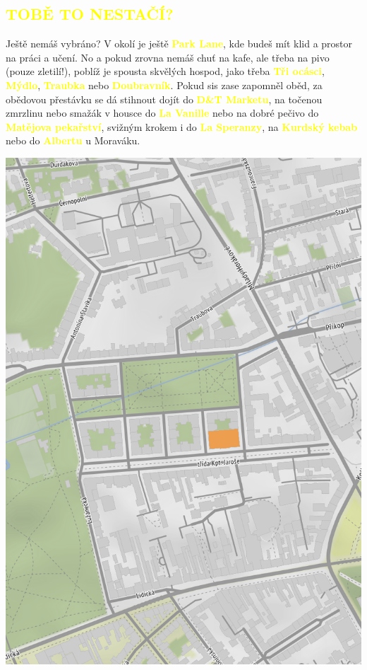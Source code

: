 \documentclass[a5paper, twoside]{article}
\newcommand{\podnadpis}[2]{
  \subsection*{\textcolor{#2}{#1}}
}
\begin{document}
\podnadpis{TOBĚ TO NESTAČÍ?}{yellow}
Ještě nemáš vybráno? V okolí je ještě \textcolor{yellow}{\textbf{Park Lane}}, kde budeš mít klid a prostor na práci a učení. No a pokud zrovna nemáš chuť na kafe, ale třeba na pivo (pouze zletilí!), poblíž je spousta skvělých hospod, jako třeba \textcolor{yellow}{\textbf{Tři ocásci}}, \textcolor{yellow}{\textbf{Mýdlo}}, \textcolor{yellow}{\textbf{Traubka}} nebo \textcolor{yellow}{\textbf{Doubravník}}. Pokud sis zase zapomněl oběd, za obědovou přestávku se dá stihnout dojít do \textcolor{yellow}{\textbf{D\&T Marketu}}, na točenou zmrzlinu nebo smažák v housce do \textcolor{yellow}{\textbf{La Vanille}} nebo na dobré pečivo do \textcolor{yellow}{\textbf{Matějova pekařství}}, svižným krokem i do \textcolor{yellow}{\textbf{La Speranzy}}, na \textcolor{yellow}{\textbf{Kurdský kebab}} nebo do \textcolor{yellow}{\textbf{Albertu}} u Moraváku.

\pagebreak

\noindent\includegraphics[width=\paperwidth]{mapa.png}
\restoregeometry
\pagebreak
\end{document}
